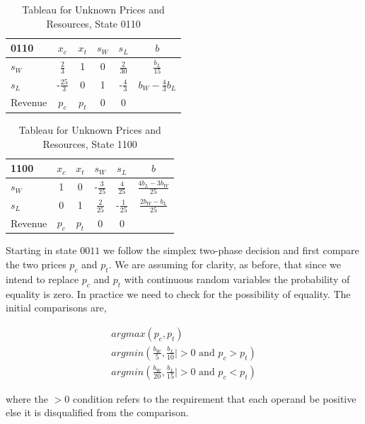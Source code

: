 \begin{table}
\centering
\begin{tabular}{| l | c c c c | c |}
\hline
0110    & $x_c$ & $x_t$ & $s_W$ & $s_L$ & $b$\\
\hline
$s_W$   & $\frac{2}{3}$    & 1  & 0  & $\frac{2}{30}$  & $\frac{b_L}{15}$\\
$s_L$   & -$\frac{25}{3}$  & 0  & 1  & -$\frac{4}{3}$  & $b_W - \frac{4}{3}b_L$\\
\hline
Revenue & $p_c$    & $p_t$    & 0     & 0     &\\
\hline
\end{tabular}
  \caption[Tableau for Unknown Prices and Resources, State 0110]
          {Tableau for Unknown Prices and Resources, State 0110}
  \label{tab:pr0110}
\end{table}

\begin{table}
\centering
\begin{tabular}{| l | c c c c | c |}
\hline
1100    & $x_c$ & $x_t$ & $s_W$ & $s_L$ & $b$\\
\hline
$s_W$   & 1  & 0  & -$\frac{3}{25}$  & $\frac{4}{25}$  & $\frac{4b_L-3b_W}{25}$\\
$s_L$   & 0  & 1  & $\frac{2}{25}$  & -$\frac{1}{25}$  & $\frac{2b_W-b_L}{25}$\\
\hline
Revenue & $p_c$    & $p_t$    & 0     & 0     &\\
\hline
\end{tabular}
  \caption[Tableau for Unknown Prices and Resources, State 1100]
          {Tableau for Unknown Prices and Resources, State 1100}
  \label{tab:pr1100}
\end{table}

Starting in state $0011$ we follow the simplex two-phase decision and
first compare the two prices $p_c$ and $p_t$. We are assuming for
clarity, as before, that since we intend to replace $p_c$ and $p_t$
with continuous random variables the probability of equality is
zero. In practice we need to check for the possibility of
equality. The initial comparisons are,

\begin{align*}
argmax(p_c, p_t)\\
argmin(\frac{b_W}{5}, \frac{b_L}{10}  | > 0 \text{ and } p_c > p_t)\\
argmin(\frac{b_W}{20}, \frac{b_L}{15} | > 0 \text{ and } p_c < p_t)
\end{align*}

where the $> 0$ condition refers to the requirement that each operand
be positive else it is disqualified from the comparison.

